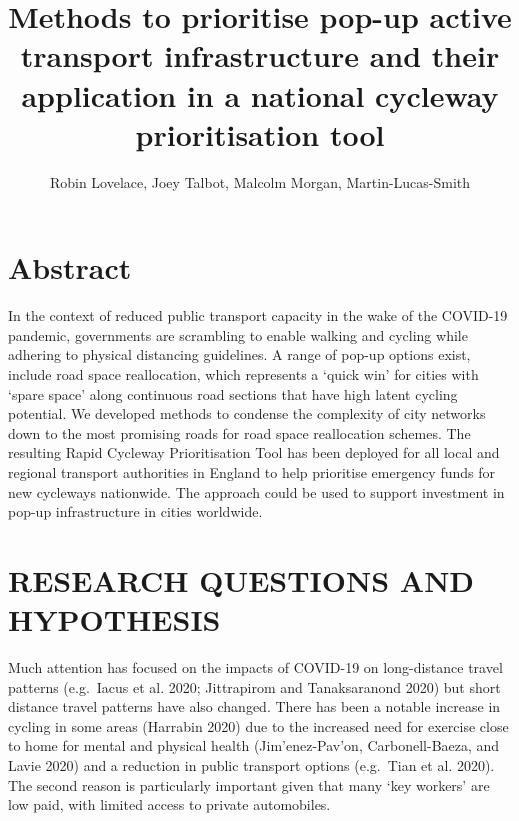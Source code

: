 \documentclass[
]{article}
\title{Methods to prioritise pop-up active transport infrastructure and their application in a national cycleway prioritisation tool}
\author{Robin Lovelace, Joey Talbot, Malcolm Morgan, Martin-Lucas-Smith}
\date{}
\begin{document}
\maketitle

{
\setcounter{tocdepth}{2}
\tableofcontents
}
\hypertarget{abstract}{%
\section{Abstract}\label{abstract}}

In the context of reduced public transport capacity in the wake of the COVID-19 pandemic, governments are scrambling to enable walking and cycling while adhering to physical distancing guidelines.
A range of pop-up options exist, include road space reallocation, which represents a `quick win' for cities with `spare space' along continuous road sections that have high latent cycling potential.
We developed methods to condense the complexity of city networks down to the most promising roads for road space reallocation schemes.
The resulting Rapid Cycleway Prioritisation Tool has been deployed for all local and regional transport authorities in England to help prioritise emergency funds for new cycleways nationwide.
The approach could be used to support investment in pop-up infrastructure in cities worldwide.

\hypertarget{research-questions-and-hypothesis}{%
\section{RESEARCH QUESTIONS AND HYPOTHESIS}\label{research-questions-and-hypothesis}}

Much attention has focused on the impacts of COVID-19 on long-distance travel patterns (e.g.~Iacus et al. 2020; Jittrapirom and Tanaksaranond 2020) but short distance travel patterns have also changed.
There has been a notable increase in cycling in some areas (Harrabin 2020) due to the increased need for exercise close to home for mental and physical health (Jim\a'enez-Pav\a'on, Carbonell-Baeza, and Lavie 2020) and a reduction in public transport options (e.g.~Tian et al. 2020).
The second reason is particularly important given that many `key workers' are low paid, with limited access to private automobiles.
\end{document}
